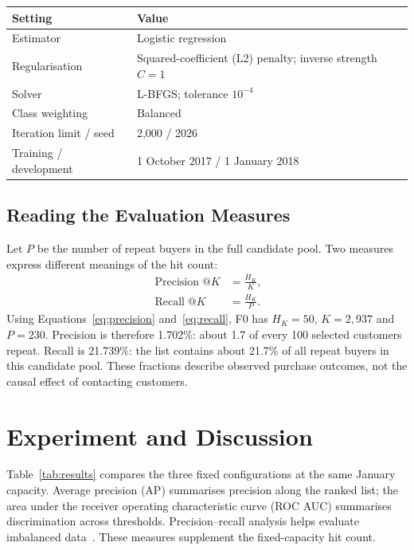 \documentclass[11pt,a4paper,journal,onecolumn]{IEEEtran}
\makeatletter
\newcommand{\tablecap}[1]{\begingroup\def\@captype{table}\caption{#1}\endgroup}
\makeatother
\begin{document}
\begin{center}
\tablecap{Shared Classifier Settings for F0, G1 and G2\label{tab:settings}}
\begin{tabularx}{\linewidth}{@{}lX@{}}\toprule
Setting & Value\\\midrule
Estimator & Logistic regression\\
Regularisation & Squared-coefficient (L2) penalty; inverse strength $C=1$\\
Solver & L-BFGS; tolerance $10^{-4}$\\
Class weighting & Balanced\\
Iteration limit / seed & 2,000 / 2026\\
Training / development & 1 October 2017 / 1 January 2018\\
\bottomrule\end{tabularx}
\end{center}
\subsection{Reading the Evaluation Measures}
Let $P$ be the number of repeat buyers in the full candidate pool. Two measures express different meanings of the hit count:
\begin{align}
\operatorname{Precision}@K&=\frac{H_K}{K},\label{eq:precision}\\
\operatorname{Recall}@K&=\frac{H_K}{P}.\label{eq:recall}
\end{align}
Using Equations~\eqref{eq:precision} and~\eqref{eq:recall}, F0 has $H_K=50$, $K=2{,}937$ and $P=230$. Precision is therefore 1.702\%: about 1.7 of every 100 selected customers repeat. Recall is 21.739\%: the list contains about 21.7\% of all repeat buyers in this candidate pool. These fractions describe observed purchase outcomes, not the causal effect of contacting customers.
\clearpage
\section{Experiment and Discussion}
Table~\ref{tab:results} compares the three fixed configurations at the same January capacity. Average precision (AP) summarises precision along the ranked list; the area under the receiver operating characteristic curve (ROC AUC) summarises discrimination across thresholds. Precision--recall analysis helps evaluate imbalanced data~\cite{saito2015}. These measures supplement the fixed-capacity hit count.
\end{document}
